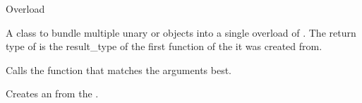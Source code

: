 \begin{ccRefClass}{Overload}


\ccDefinition 

A class to bundle multiple unary  or
 objects into a single overload of
. The return type of  is the
result_type of the first function of the  it was created from.

\ccOperations

{Calls the function that matches the arguments best.}

{Creates an  from the  .}


\end{ccRefClass} 
